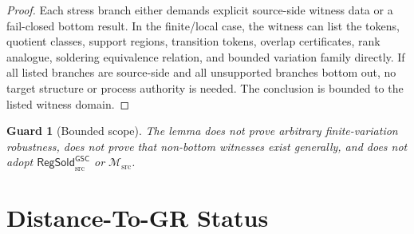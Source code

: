 \documentclass[11pt]{article}
\newcommand{\Msrc}{\mathcal{M}_{\mathrm{src}}}
\newcommand{\RegSold}{\mathsf{RegSold}_{\mathrm{src}}^{\mathsf{GSC}}}
\newtheorem{guard}{Guard}
\begin{document}
\begin{proof}
Each stress branch either demands explicit source-side witness data or a
fail-closed bottom result. In the finite/local case, the witness can list the
tokens, quotient classes, support regions, transition tokens, overlap
certificates, rank analogue, soldering equivalence relation, and bounded
variation family directly. If all listed branches are source-side and all
unsupported branches bottom out, no target structure or process authority is
needed. The conclusion is bounded to the listed witness domain.
\end{proof}

\begin{guard}[Bounded scope]
The lemma does not prove arbitrary finite-variation robustness, does not prove
that non-bottom witnesses exist generally, and does not adopt \(\RegSold\) or
\(\Msrc\).
\end{guard}

\section{Distance-To-GR Status}
\end{document}
